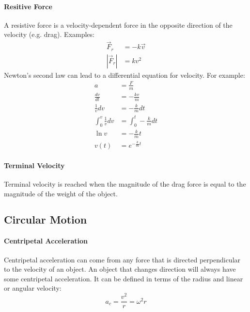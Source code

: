 \documentclass{article}
\begin{document}
            \paragraph{Resitive Force}
            A resistive force is a velocity-dependent force in the opposite direction of the velocity (e.g. drag). Examples:
            \begin{align}
                \vec{F}_r &= - k \vec{v} \\
                \left| \vec{F}_r \right| &= k v^2
            \end{align}
            Newton's second law can lead to a differential equation for velocity. For example:
            \begin{align}
                a &= \frac{F}{m} \nonumber\\
                \frac{dv}{dt} &= - \frac{kv}{m} \nonumber\\
                \frac{1}{v} dv &= - \frac{k}{m} dt \nonumber\\
                \int_0^v \frac{1}{v} dv &= \int_0^t - \frac{k}{m} dt \nonumber\\
                \ln{v} &= - \frac{k}{m} t \nonumber\\
                v(t) &= e^{- \frac{k}{m}t} \nonumber
            \end{align}

            \paragraph{Terminal Velocity}
            Terminal velocity is reached when the magnitude of the drag force is equal to the magnitude of the weight of the object.

        \subsection{Circular Motion}
            \paragraph{Centripetal Acceleration}
            Centripetal acceleration can come from any force that is directed perpendicular to the velocity of an object. An object that changes direction will always have some centripetal acceleration. It can be defined in terms of the radius and linear or angular velocity:
            \begin{equation}
                a_c = \frac{v^2}{r} = \omega^2 r
            \end{equation}
\end{document}
